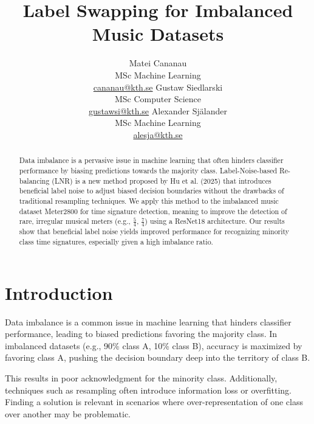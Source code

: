 \documentclass{article}
\title{Label Swapping for Imbalanced Music Datasets}
\author{
  Matei Cananau\\
  MSc Machine Learning\\
  \href{mailto:cananau@kth.se}{cananau@kth.se} \And Gustaw Siedlarski\\
  MSc Computer Science\\
  \href{mailto:gustawsi@kth.se}{gustawsi@kth.se} \And Alexander Själander\\
  MSc Machine Learning\\
  \href{mailto:alesja@kth.se}{alesja@kth.se}
}
\begin{document}
\maketitle

\begin{abstract}
    Data imbalance is a pervasive issue in machine learning that often hinders classifier performance by biasing predictions towards the majority class. Label-Noise-based Re-balancing (LNR) is a new method proposed by Hu et al. (2025) that introduces beneficial label noise to adjust biased decision boundaries without the drawbacks of traditional resampling techniques. We apply this method to the imbalanced music dataset Meter2800 for time signature detection, meaning to improve the detection of rare, irregular musical meters (e.g., $\frac{5}{4}$, $\frac{7}{4}$) using a ResNet18 architecture. Our results show that beneficial label noise yields improved performance for recognizing minority class time signatures, especially given a high imbalance ratio.
\end{abstract}


\section{Introduction}

Data imbalance is a common issue in machine learning that hinders classifier performance, leading to biased predictions favoring the majority class. In imbalanced datasets (e.g., 90\% class A, 10\% class B), accuracy is maximized by favoring class A, pushing the decision boundary deep into the territory of class B.

This results in poor acknowledgment for the minority class. Additionally, techniques such as resampling often introduce information loss or overfitting. Finding a solution is relevant in scenarios where over-representation of one class over another may be problematic.
\end{document}
